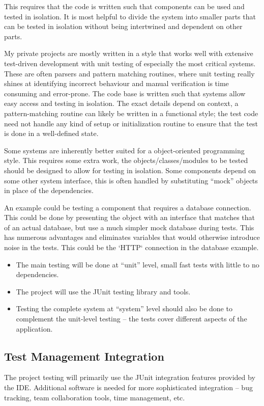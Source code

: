 This requires that the code is written such that components can be used and
tested in isolation.  It is most helpful to divide the system into smaller
parts that can be tested in isolation without being intertwined and dependent
on other parts.

My private projects are mostly written in a style that works well with
extensive test-driven development with unit testing of especially the most
critical systems. These are often parsers and pattern matching routines, where
unit testing really shines at identifying incorrect behaviour and manual
verification is time consuming and error-prone. The code base is written such
that systems allow easy access and testing in isolation. The exact details
depend on context, a pattern-matching routine can likely be written in a
functional style; the test code need not handle any kind of setup or
initialization routine to ensure that the test is done in a well-defined state.

Some systems are inherently better suited for a object-oriented programming
style.  This requires some extra work, the objects/classes/modules to be tested
should be designed to allow for testing in isolation. Some components depend on
some other system interface, this is often handled by substituting ``mock''
objects in place of the dependencies.

An example could be testing a component that requires a database connection.
This could be done by presenting the object with an interface that matches that
of an actual database, but use a much simpler mock database during tests. This
has numerous advantages and eliminates variables that would otherwise introduce
noise in the tests. This could be the `HTTP` connection in the database
example.

\begin{itemize}
  \item The main testing will be done at ``unit'' level, small fast tests with
        little to no dependencies.
  \item The project will use the JUnit testing library and tools.
  \item Testing the complete system at ``system'' level should also be done to
        complement the unit-level testing -- the tests cover different aspects
        of the application.
\end{itemize}


\subsection{Test Management Integration}
The project testing will primarily use the JUnit integration features provided
by the IDE.  Additional software is needed for more sophisticated integration
-- bug tracking, team collaboration tools, time management, etc.

